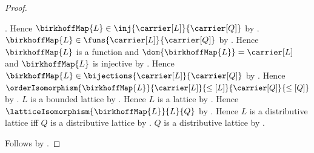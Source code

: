 \begin{proof}
\begin{subproof}
            .
        Hence $\birkhoffMap{L}\in\inj{\carrier[L]}{\carrier[Q]}$ by
            .
        $\birkhoffMap{L}\in\funs{\carrier[L]}{\carrier[Q]}$ by
            .
        Hence $\birkhoffMap{L}$ is a function and
            $\dom{\birkhoffMap{L}}=\carrier[L]$ and
            $\birkhoffMap{L}$ is injective by
            .
        Hence $\birkhoffMap{L}\in
            \bijections{\carrier[L]}{\carrier[Q]}$ by
            .
        Hence $\orderIsomorphism
            {\birkhoffMap{L}}
            {\carrier[L]}{\leq[L]}
            {\carrier[Q]}{\leq[Q]}$ by
            .
        $L$ is a bounded lattice by .
        Hence $L$ is a lattice by .
        Hence $\latticeIsomorphism{\birkhoffMap{L}}{L}{Q}$ by
            .
        Hence $L$ is a distributive lattice iff
            $Q$ is a distributive lattice by
            .
        $Q$ is a distributive lattice by
            .
    \end{subproof}
    Follows by \auto.
\end{proof}

